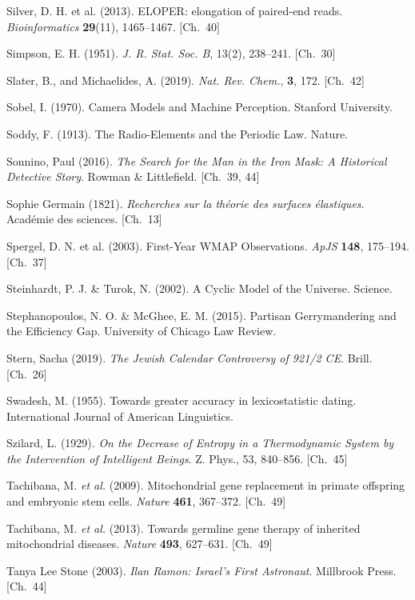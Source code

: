 \begin{list}{}{%
  \setlength{\leftmargin}{2em}%
  \setlength{\itemindent}{-2em}%
  \setlength{\itemsep}{0.35\baselineskip}%
  \setlength{\parsep}{0pt}%
  \setlength{\topsep}{0.5em}}
\item Silver, D. H. et al. (2013). ELOPER: elongation of paired-end reads. \textit{Bioinformatics} \textbf{29}(11), 1465–1467. \hfill {\scriptsize [Ch.~40]}
\item Simpson, E. H. (1951). \textit{J. R. Stat. Soc. B}, 13(2), 238–241. \hfill {\scriptsize [Ch.~30]}
\item Slater, B., and Michaelides, A. (2019). \textit{Nat. Rev. Chem.}, \textbf{3}, 172. \hfill {\scriptsize [Ch.~42]}
\item Sobel, I. (1970). Camera Models and Machine Perception. Stanford University.
\item Soddy, F. (1913). The Radio-Elements and the Periodic Law. Nature.
\item Sonnino, Paul (2016). \textit{The Search for the Man in the Iron Mask: A Historical Detective Story}. Rowman \& Littlefield. \hfill {\scriptsize [Ch.~39, 44]}
\item Sophie Germain (1821). \textit{Recherches sur la théorie des surfaces élastiques}. Académie des sciences. \hfill {\scriptsize [Ch.~13]}
\item Spergel, D. N. et al. (2003). First-Year WMAP Observations. \textit{ApJS} \textbf{148}, 175–194. \hfill {\scriptsize [Ch.~37]}
\item Steinhardt, P. J. \& Turok, N. (2002). A Cyclic Model of the Universe. Science.
\item Stephanopoulos, N. O. \& McGhee, E. M. (2015). Partisan Gerrymandering and the Efficiency Gap. University of Chicago Law Review.
\item Stern, Sacha (2019). \textit{The Jewish Calendar Controversy of 921/2 CE}. Brill. \hfill {\scriptsize [Ch.~26]}
\item Swadesh, M. (1955). Towards greater accuracy in lexicostatistic dating. International Journal of American Linguistics.
\item Szilard, L. (1929). \textit{On the Decrease of Entropy in a Thermodynamic System by the Intervention of Intelligent Beings}. Z. Phys., 53, 840–856. \hfill {\scriptsize [Ch.~45]}
\item Tachibana, M. \textit{et al.} (2009). Mitochondrial gene replacement in primate offspring and embryonic stem cells. \textit{Nature} \textbf{461}, 367–372. \hfill {\scriptsize [Ch.~49]}
\item Tachibana, M. \textit{et al.} (2013). Towards germline gene therapy of inherited mitochondrial diseases. \textit{Nature} \textbf{493}, 627–631. \hfill {\scriptsize [Ch.~49]}
\item Tanya Lee Stone (2003). \textit{Ilan Ramon: Israel's First Astronaut}. Millbrook Press. \hfill {\scriptsize [Ch.~44]}

\end{list}
